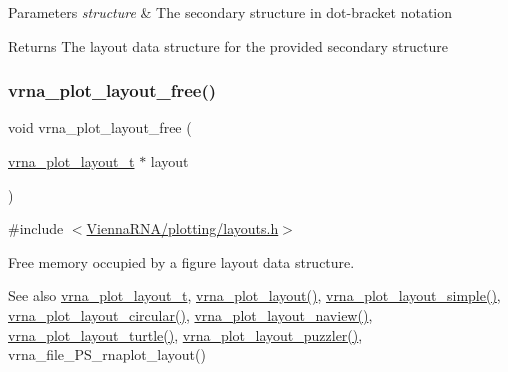 \begin{DoxyParams}{Parameters}
{\em structure} & The secondary structure in dot-\/bracket notation \\
\hline
\end{DoxyParams}
\begin{DoxyReturn}{Returns}
The layout data structure for the provided secondary structure 
\end{DoxyReturn}
\mbox{\label{group__plot__layout__utils_ga996128730020a2d7a7368b4248195931}} 
\subsubsection{\texorpdfstring{vrna\_plot\_layout\_free()}{vrna\_plot\_layout\_free()}}
{\footnotesize\ttfamily void vrna\+\_\+plot\+\_\+layout\+\_\+free (\begin{DoxyParamCaption}\item[{\mbox{\hyperlink{group__plot__layout__utils_gac986fe092abc2a6a93ceb5141e4dd28b}{vrna\+\_\+plot\+\_\+layout\+\_\+t}} $\ast$}]{layout }\end{DoxyParamCaption})}



{\ttfamily \#include $<$\mbox{\hyperlink{layouts_8h}{Vienna\+R\+N\+A/plotting/layouts.\+h}}$>$}



Free memory occupied by a figure layout data structure. 

\begin{DoxySeeAlso}{See also}
\mbox{\hyperlink{group__plot__layout__utils_gac986fe092abc2a6a93ceb5141e4dd28b}{vrna\+\_\+plot\+\_\+layout\+\_\+t}}, \mbox{\hyperlink{group__plot__layout__utils_ga7953b759eada86c61b0a4aebe0dc67d1}{vrna\+\_\+plot\+\_\+layout()}}, \mbox{\hyperlink{group__plot__layout__utils_ga8b09019a429c7c2447be94901c7ed658}{vrna\+\_\+plot\+\_\+layout\+\_\+simple()}}, \mbox{\hyperlink{group__plot__layout__utils_ga41d94adbd42e1a570d840756e6dd6909}{vrna\+\_\+plot\+\_\+layout\+\_\+circular()}}, \mbox{\hyperlink{group__plot__layout__utils_gab0e886afe200db9323e4e65d44738177}{vrna\+\_\+plot\+\_\+layout\+\_\+naview()}}, \mbox{\hyperlink{group__plot__layout__utils_ga4ecd3401e22933a44bf31d14320e59b1}{vrna\+\_\+plot\+\_\+layout\+\_\+turtle()}}, \mbox{\hyperlink{group__plot__layout__utils_ga57f815d56c8c083c016381213f581f1e}{vrna\+\_\+plot\+\_\+layout\+\_\+puzzler()}}, vrna\+\_\+file\+\_\+\+P\+S\+\_\+rnaplot\+\_\+layout()
\end{DoxySeeAlso}

